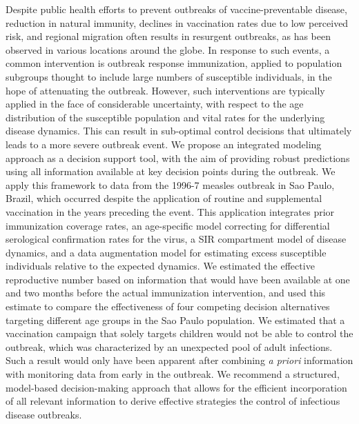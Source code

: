 Despite public health efforts to prevent outbreaks of vaccine-preventable disease, reduction in natural immunity, declines in vaccination rates due to low perceived risk, and regional migration  often results in resurgent outbreaks, as has been observed in various locations around the globe. In response to such events, a common intervention is outbreak response immunization, applied to population subgroups thought to include large numbers of susceptible individuals, in the hope of attenuating the outbreak. However, such interventions are typically applied in the face of considerable uncertainty, with respect to the age distribution of the susceptible population and vital rates for the underlying disease dynamics. This can result in sub-optimal control decisions that ultimately leads to a more severe outbreak event. We propose an integrated modeling approach as a decision support tool, with the aim of providing robust predictions using all information available at key decision points during the outbreak. We apply this framework to data from the 1996-7 measles outbreak in Sao Paulo, Brazil, which occurred despite the application of routine and supplemental vaccination in the years preceding the event. This application integrates prior immunization coverage rates, an age-specific model correcting for differential serological confirmation rates for the virus, a SIR compartment model of disease dynamics, and a data augmentation model for estimating excess susceptible individuals relative to the expected dynamics. We estimated the effective reproductive number based on information that would have been available at one and two months before the actual immunization intervention, and used this estimate to compare the effectiveness of four competing decision alternatives targeting different age groups in the Sao Paulo population. We estimated that a vaccination campaign that solely targets children would not be able to control the outbreak, which was characterized by an unexpected pool of adult infections. Such a result would only have been apparent after combining \textit{a priori} information with monitoring data from early in the outbreak. We recommend a structured, model-based decision-making approach that allows for the efficient incorporation of all relevant information to derive effective strategies the control of infectious disease outbreaks.
